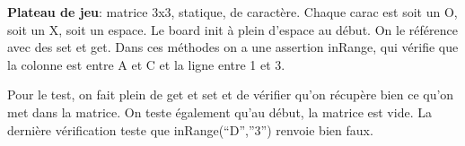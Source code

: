 \textbf{Plateau de jeu}: matrice 3x3, statique, de caractère. Chaque carac est soit un O, soit un X, soit un espace. Le board init à plein d’espace au début. On le référence avec des set et get.
Dans ces méthodes on a une assertion inRange, qui vérifie que la colonne est entre A et C et la ligne entre 1 et 3.

Pour le test, on fait plein de get et set et de vérifier qu’on récupère bien ce qu’on met dans la matrice. On teste également qu’au début, la matrice est vide. La dernière vérification teste que inRange(“D”,”3”) renvoie bien faux.